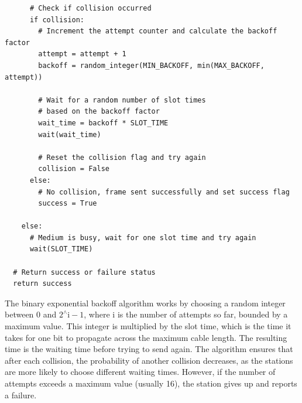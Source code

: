 \documentclass[main.tex]{subfiles}
\begin{document}
\begin{enumerate}
\begin{enumerate}
\begin{verbatim}
      # Check if collision occurred
      if collision:
        # Increment the attempt counter and calculate the backoff factor
        attempt = attempt + 1
        backoff = random_integer(MIN_BACKOFF, min(MAX_BACKOFF, attempt))
        
        # Wait for a random number of slot times 
        # based on the backoff factor
        wait_time = backoff * SLOT_TIME
        wait(wait_time)
        
        # Reset the collision flag and try again
        collision = False
      else:
        # No collision, frame sent successfully and set success flag
        success = True
    
    else:
      # Medium is busy, wait for one slot time and try again
      wait(SLOT_TIME)
  
  # Return success or failure status
  return success
\end{verbatim}

        The binary exponential backoff algorithm works by choosing a random integer between 0 and $2^{\wedge} \mathrm{i}-1$, where $\mathrm{i}$ is the number of attempts so far, bounded by a maximum value. This integer is multiplied by the slot time, which is the time it takes for one bit to propagate across the maximum cable length. The resulting time is the waiting time before trying to send again. The algorithm ensures that after each collision, the probability of another collision decreases, as the stations are more likely to choose different waiting times. However, if the number of attempts exceeds a maximum value (usually 16), the station gives up and reports a failure.


\end{enumerate}
\end{enumerate}
\end{document}
